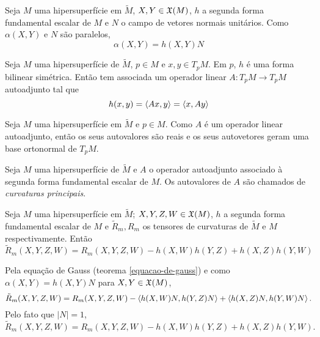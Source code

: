 \begin{observacao}
	Seja $M$ uma hipersuperfície em $\tilde{M}$,
	$X,Y \in \mathfrak{X}(M)$,
	$h$ a segunda forma fundamental escalar de $M$ e
	$N$ o campo de vetores normais unitários.
	Como $\alpha(X,Y)$ e $N$ são paralelos,
	\begin{equation*}
		\alpha(X,Y) = h(X,Y) N
	\end{equation*}
\end{observacao}

\begin{observacao}
	Seja $M$ uma hipersuperfície de $\tilde{M}$,
	$p \in M$ e 
	$x,y \in T_p M$.
	Em $p$, $h$ é uma forma bilinear simétrica.
	Então tem associada um operador linear $A: T_p M \rightarrow T_p M$ autoadjunto tal que
	\begin{equation*}
		h(x,y) = \left\langle Ax,y \right\rangle = \left\langle x,Ay \right\rangle
	\end{equation*}
\end{observacao}

\begin{observacao}
	Seja $M$ uma hipersuperfície em $\tilde{M}$ e
	$p \in M$.
	Como $A$ é um operador linear autoadjunto, então os seus autovalores são reais e os seus autovetores geram uma base ortonormal de $T_p M$.
\end{observacao}

\begin{definicao}
	Seja $M$ uma hipersuperfície de $\tilde{M}$ e
	$A$ o operador autoadjunto associado à segunda forma fundamental escalar de $M$.
	Os autovalores de $A$ são chamados de \emph{curvaturas principais}.
\end{definicao}


\begin{corolario}\label{equacao-de-gauss-hipersuperficies}
	Seja $M$ uma hipersuperfície em $\tilde{M}$;
	$X,Y,Z,W \in \mathfrak{X}(M)$,
	$h$ a segunda forma fundamental escalar de $M$ e
	$\tilde{R}_m, R_m$ os tensores de curvaturas de $\tilde{M}$ e $M$ respectivamente.
	Então
	\begin{equation*}
		\tilde{R}_m(X,Y,Z,W) = R_m(X,Y,Z,W) - h(X,W) h(Y,Z) + h(X,Z) h(Y,W)
	\end{equation*}
\end{corolario}

\begin{demonstracao}
	Pela equação de Gauss (teorema \ref{equacao-de-gauss}) e como $\alpha(X,Y)= h(X,Y) N$ para $X,Y \in \mathfrak{X}(M)$,
	\begin{equation*}
	\tilde{R}_m(X,Y,Z,W) = R_m(X,Y,Z,W) - \left\langle h(X,W) N,h(Y,Z) N \right\rangle + \left\langle h(X,Z)N,h(Y,W)N \right\rangle.
	\end{equation*}
	Pelo fato que $|N|=1$,
	\begin{equation*}
	\tilde{R}_m(X,Y,Z,W) = R_m(X,Y,Z,W) - h(X,W) h(Y,Z) + h(X,Z) h(Y,W).
	\end{equation*}
\end{demonstracao}

